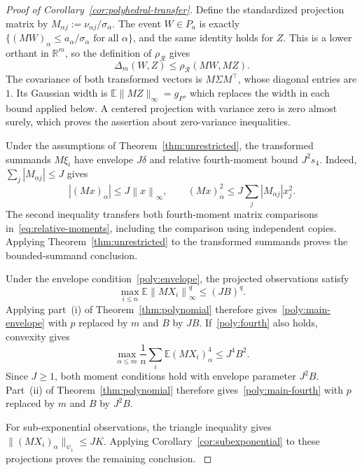 \documentclass[11pt,letterpaper]{article}
\newenvironment{recovered}{}{}
\newcommand{\vSix}[1]{{\color{magenta}#1}}
\theoremstyle{remark}
\newcommand{\E}{\mathbb E}
\newcommand{\R}{\mathbb R}
\newcommand{\norm}[1]{\left\lVert#1\right\rVert}
\newcommand{\rh}{\rho_{\mathcal R}}
\begin{document}
\begin{proof}[Proof of Corollary~\ref{cor:polyhedral-transfer}]
\begin{recovered}
Define the standardized projection matrix by
\(M_{\alpha j}:=\nu_{\alpha j}/\sigma_\alpha\).
\end{recovered}
The event \(W\in P_a\) is exactly
\(\{(MW)_\alpha\le a_\alpha/\sigma_\alpha\text{ for all }\alpha\}\),
and the same identity holds for \(Z\). This is a lower orthant in
\(\R^m\), so the definition of \(\rh\) gives
\begin{equation}
 \Delta_m(W,Z)\le\rh(MW,MZ).
 \label{eq:polyhedral-transfer}
\end{equation}
The covariance of both transformed vectors
is \(M\Sigma M^\top\), whose diagonal entries are \(1\).
\vSix{Its Gaussian width is \(\E\|MZ\|_\infty=g_P\), which
replaces the width in each bound applied below.}
A centered projection with variance zero is zero almost surely,
which proves the assertion about zero-variance inequalities.

Under the assumptions of Theorem~\ref{thm:unrestricted}, the
transformed summands \(M\xi_i\) have envelope \(J\delta\) and
relative fourth-moment bound \(J^2s_4\).
Indeed, \(\sum_j|M_{\alpha j}|\le J\) gives
\[
 |(Mx)_\alpha|\le J\norm{x}_\infty,
 \qquad
 (Mx)_\alpha^2\le J\sum_j|M_{\alpha j}|x_j^2.
\]
The second inequality transfers both fourth-moment matrix comparisons
in~\eqref{eq:relative-moments}, including the comparison using
independent copies. \begin{recovered}Applying
Theorem~\ref{thm:unrestricted} to the transformed summands proves the
bounded-summand conclusion.\end{recovered}

\begin{recovered}
Under the envelope condition~\eqref{poly:envelope}, the projected
observations satisfy
\[
 \max_{i\le n}\E\norm{MX_i}_\infty^q\le(JB)^q.
\]
Applying part~\textup{(i)} of Theorem~\ref{thm:polynomial} therefore
gives~\eqref{poly:main-envelope} with \(p\) replaced by \(m\) and
\(B\) by \(JB\). If~\eqref{poly:fourth} also holds, convexity gives
\[
 \max_{\alpha\le m}\frac1n\sum_i\E(MX_i)_\alpha^4\le J^4B^2.
\]
Since \(J\ge1\), both moment conditions hold with envelope parameter
\(J^2B\). Part~\textup{(ii)} of Theorem~\ref{thm:polynomial}
therefore gives~\eqref{poly:main-fourth} with \(p\) replaced by
\(m\) and \(B\) by \(J^2B\).
\end{recovered}

For sub-exponential observations, the triangle inequality gives
\(\|(MX_i)_\alpha\|_{\psi_1}\le JK\).
\begin{recovered}
Applying Corollary~\ref{cor:subexponential} to these projections proves
the remaining conclusion.
\end{recovered}
\end{proof}
\end{document}
